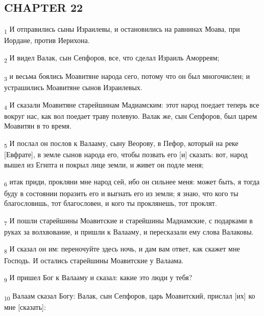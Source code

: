 \subsection{CHAPTER 22}
\begin{tcolorbox}
\textsubscript{1} И отправились сыны Израилевы, и остановились на равнинах Моава, при Иордане, против Иерихона.
\end{tcolorbox}
\begin{tcolorbox}
\textsubscript{2} И видел Валак, сын Сепфоров, все, что сделал Израиль Аморреям;
\end{tcolorbox}
\begin{tcolorbox}
\textsubscript{3} и весьма боялись Моавитяне народа сего, потому что он был многочислен; и устрашились Моавитяне сынов Израилевых.
\end{tcolorbox}
\begin{tcolorbox}
\textsubscript{4} И сказали Моавитяне старейшинам Мадиамским: этот народ поедает теперь все вокруг нас, как вол поедает траву полевую. Валак же, сын Сепфоров, был царем Моавитян в то время.
\end{tcolorbox}
\begin{tcolorbox}
\textsubscript{5} И послал он послов к Валааму, сыну Веорову, в Пефор, который на реке [Евфрате], в земле сынов народа его, чтобы позвать его [и] сказать: вот, народ вышел из Египта и покрыл лице земли, и живет он подле меня;
\end{tcolorbox}
\begin{tcolorbox}
\textsubscript{6} итак приди, прокляни мне народ сей, ибо он сильнее меня: может быть, я тогда буду в состоянии поразить его и выгнать его из земли; я знаю, что кого ты благословишь, тот благословен, и кого ты проклянешь, тот проклят.
\end{tcolorbox}
\begin{tcolorbox}
\textsubscript{7} И пошли старейшины Моавитские и старейшины Мадиамские, с подарками в руках за волхвование, и пришли к Валааму, и пересказали ему слова Валаковы.
\end{tcolorbox}
\begin{tcolorbox}
\textsubscript{8} И сказал он им: переночуйте здесь ночь, и дам вам ответ, как скажет мне Господь. И остались старейшины Моавитские у Валаама.
\end{tcolorbox}
\begin{tcolorbox}
\textsubscript{9} И пришел Бог к Валааму и сказал: какие это люди у тебя?
\end{tcolorbox}
\begin{tcolorbox}
\textsubscript{10} Валаам сказал Богу: Валак, сын Сепфоров, царь Моавитский, прислал [их] ко мне [сказать]:
\end{tcolorbox}
